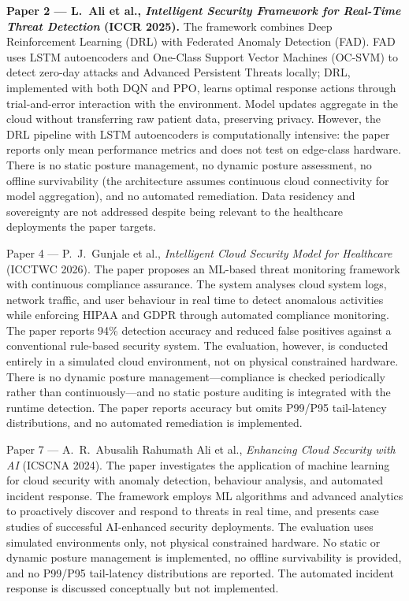 \textbf{Paper 2 --- L.~Ali et al., \textit{Intelligent Security Framework for Real-Time Threat Detection} (ICCR 2025).} The framework combines Deep Reinforcement Learning (DRL) with Federated Anomaly Detection (FAD). FAD uses LSTM autoencoders and One-Class Support Vector Machines (OC-SVM) to detect zero-day attacks and Advanced Persistent Threats locally; DRL, implemented with both DQN and PPO, learns optimal response actions through trial-and-error interaction with the environment. Model updates aggregate in the cloud without transferring raw patient data, preserving privacy. However, the DRL pipeline with LSTM autoencoders is computationally intensive: the paper reports only mean performance metrics and does not test on edge-class hardware. There is no static posture management, no dynamic posture assessment, no offline survivability (the architecture assumes continuous cloud connectivity for model aggregation), and no automated remediation. Data residency and sovereignty are not addressed despite being relevant to the healthcare deployments the paper targets.

{Paper 4 --- P.~J.~Gunjale et al., \textit{Intelligent Cloud Security Model for Healthcare} (ICCTWC 2026).} The paper proposes an ML-based threat monitoring framework with continuous compliance assurance. The system analyses cloud system logs, network traffic, and user behaviour in real time to detect anomalous activities while enforcing HIPAA and GDPR through automated compliance monitoring. The paper reports 94\% detection accuracy and reduced false positives against a conventional rule-based security system. The evaluation, however, is conducted entirely in a simulated cloud environment, not on physical constrained hardware. There is no dynamic posture management---compliance is checked periodically rather than continuously---and no static posture auditing is integrated with the runtime detection. The paper reports accuracy but omits P99/P95 tail-latency distributions, and no automated remediation is implemented.

{Paper 7 --- A.~R.~Abusalih Rahumath Ali et al., \textit{Enhancing Cloud Security with AI} (ICSCNA 2024).} The paper investigates the application of machine learning for cloud security with anomaly detection, behaviour analysis, and automated incident response. The framework employs ML algorithms and advanced analytics to proactively discover and respond to threats in real time, and presents case studies of successful AI-enhanced security deployments. The evaluation uses simulated environments only, not physical constrained hardware. No static or dynamic posture management is implemented, no offline survivability is provided, and no P99/P95 tail-latency distributions are reported. The automated incident response is discussed conceptually but not implemented.


